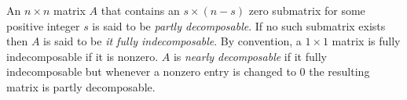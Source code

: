 \documentclass{article}
\begin{document}
 An  $n\times n$ matrix $A$   that contains an $s \times (n-s)$ zero submatrix for some positive integer $s$ is said to be {\it partly decomposable}. If no such submatrix exists then $A$
is said to be \emph{ it fully  indecomposable}. 
By convention, a $1 \times 1$ matrix is fully indecomposable if it is nonzero.
$A$ is {\it nearly decomposable} if it fully indecomposable but whenever a nonzero  entry is changed to 0 the resulting matrix is partly decomposable.
\end{document}
